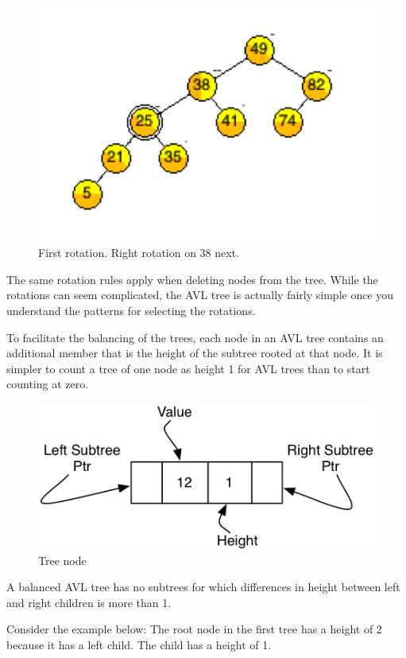 \begin{figure}[H]
\centering
\includegraphics{pictures/tree11.png}
\caption{First rotation. Right rotation on 38 next.}
\label{fig:tree11}
\end{figure}

The same rotation rules apply when deleting nodes from the tree. While the rotations can seem complicated, the AVL tree is actually fairly simple once you understand the patterns for selecting the rotations.

To facilitate the balancing of the trees, each node in an AVL tree contains an additional member that is the height of the subtree rooted at that node. It is simpler to count a tree of one node as height 1 for AVL trees than to start counting at zero.

\begin{figure}[H]
\centering
\includegraphics{pictures/tree12.png}
\caption{Tree node}
\label{fig:tree12}
\end{figure}

A balanced AVL tree has no subtrees for which differences in height between left and right children is more than 1.

Consider the example below: The root node in the first tree has a height of 2 because it has a left child. The child has a height of 1.

